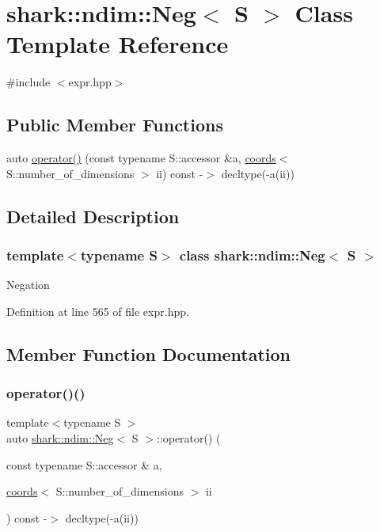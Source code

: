 \hypertarget{classshark_1_1ndim_1_1_neg}{}\section{shark\+:\+:ndim\+:\+:Neg$<$ S $>$ Class Template Reference}
\label{classshark_1_1ndim_1_1_neg}


{\ttfamily \#include $<$expr.\+hpp$>$}

\subsection*{Public Member Functions}
\begin{DoxyCompactItemize}
\item 
auto \hyperlink{classshark_1_1ndim_1_1_neg_a36cc3e8ae8bac2421a59271e47f56000}{operator()} (const typename S\+::accessor \&a, \hyperlink{structshark_1_1ndim_1_1coords}{coords}$<$ S\+::number\+\_\+of\+\_\+dimensions $>$ ii) const -\/$>$ decltype(-\/a(ii))
\end{DoxyCompactItemize}


\subsection{Detailed Description}
\subsubsection*{template$<$typename S$>$\newline
class shark\+::ndim\+::\+Neg$<$ S $>$}

Negation 

Definition at line 565 of file expr.\+hpp.



\subsection{Member Function Documentation}
\hypertarget{classshark_1_1ndim_1_1_neg_a36cc3e8ae8bac2421a59271e47f56000}{}\label{classshark_1_1ndim_1_1_neg_a36cc3e8ae8bac2421a59271e47f56000} 
\subsubsection{\texorpdfstring{operator()()}{operator()()}}
{\footnotesize\ttfamily template$<$typename S $>$ \\
auto \hyperlink{classshark_1_1ndim_1_1_neg}{shark\+::ndim\+::\+Neg}$<$ S $>$\+::operator() (\begin{DoxyParamCaption}\item[{const typename S\+::accessor \&}]{a,  }\item[{\hyperlink{structshark_1_1ndim_1_1coords}{coords}$<$ S\+::number\+\_\+of\+\_\+dimensions $>$}]{ii }\end{DoxyParamCaption}) const -\/$>$ decltype(-\/a(ii)) \hspace{0.3cm}{\ttfamily [inline]}}



